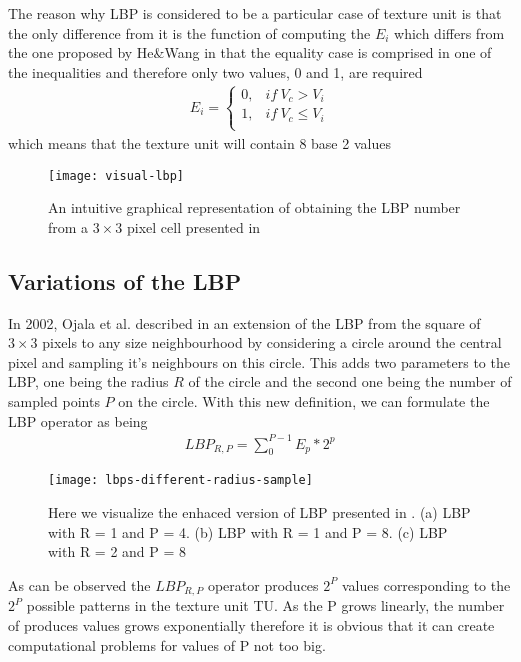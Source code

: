 The reason why LBP is considered to be a particular case of texture unit is that the only difference from it is the function of computing the $E_i$ which differs from the one proposed by He\&Wang in that the equality case is comprised in one of the inequalities and therefore only two values, 0 and 1, are required
\begin{align}
E_i = \begin{cases}
0, & if\ V_c > V_i \\
1, & if\ V_c \leq V_i \\
\end{cases}
\end{align}
which means that the texture unit will contain 8 base 2 values

\begin{figure}[h]
	\begin{center}
		\texttt{[image: visual-lbp]}
	\end{center}
	\caption[Visual representation of \textbf{LBP} computation]{An intuitive graphical representation of obtaining the LBP number from a $3\times3$ pixel cell presented in \cite{lu2014divided}}
\end{figure}

\subsection{Variations of the LBP}
In 2002, Ojala et al. described in \cite{OjalaPM02} an extension of the LBP from the square of $3\times3$ pixels to any size neighbourhood by considering a circle around the central pixel and sampling it's neighbours on this circle. This adds two parameters to the LBP, one being the radius $R$ of the circle and the second one being the number of sampled points $P$ on the circle.  With this new definition, we can formulate the LBP operator as being
\begin{align}
	LBP_{R,P} = \sum_{0}^{P-1}E_p*2^p
\end{align}

\begin{figure}[h]
	\begin{center}
		\texttt{[image: lbps-different-radius-sample]}
	\end{center}
	\caption[Enhanced LBP visualisation]{Here we visualize the enhaced version of LBP presented in \cite{OjalaPM02}. (a) LBP with R = 1 and P = 4. (b) LBP with R = 1 and P = 8. (c) LBP with R = 2 and P = 8}
\end{figure}
As can be observed the $LBP_{R,P}$ operator produces $2^P$ values corresponding to the $2^P$ possible patterns in the texture unit TU. As the P grows linearly, the number of produces values grows exponentially therefore it is obvious that it can create computational problems for values of P not too big.

